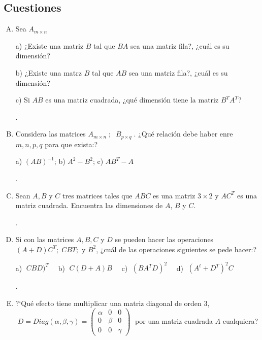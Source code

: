 \subsection{Cuestiones}

\begin{enumerate}[Q. 1] 

\item Sea $A_{m \times n}$

a) ¿Existe una matriz $B$ tal que $BA$ sea una matriz fila?, ¿cuál es su dimensión?

b) ¿Existe una matrz $B$ tal que $AB$ sea una matriz fila?, ¿cuál es su dimensión?

c) Si $AB$ es una matriz cuadrada, ¿qué dimensión tiene la matriz $B^TA^T$?

.

\item Considera las matrices $A_{m \times n}\; ; \; \; B_{p \times q}\;$. ¿Qué relación debe haber enre $m,n,p,q$ para que exista:?

a) $(AB)^{-1}$; \hspace{5mm} b) $A^2-B^2$; \hspace{5mm} c) $AB^T-A$

.

\item Sean $A, B$ y $C$ tres matrices tales que $ABC$ es una matriz  $3 \times 2$ y $AC^T$ es una matriz cuadrada. Encuentra las dimensiones de $A$, $B$ y $C$.

.

\item Si con las matrices $A,B,C$ y $D$ se pueden hacer las operaciones $(A+D)C^T; \; CBT; \text{ y }B^2$, ¿cuál de las operaciones siguientes se pede hacer:?

a) $\; CBD)^T\quad$ b) $\; C(D+A)B\quad$ c) $\; (BA^TD)^2\quad $ d) $\; (A^t+D^T)^2C$

.

\item  ?`Qué efecto tiene multiplicar una matriz diagonal de orden $3$, $\; D=Diag(\alpha,\beta,\gamma)=\left( \begin{array}{ccc} \alpha&0&0 \\0&\beta&0 \\ 0&0&\gamma \end{array} \right)\;$ por una matriz cuadrada $A$ cualquiera?


\end{enumerate}
